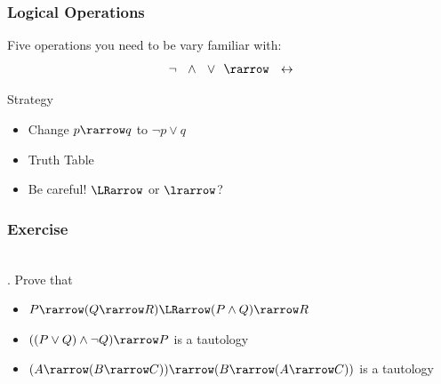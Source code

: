 \documentclass[xcolor=table]{beamer}
\begin{document}
\begin{frame}
    \frametitle{Logical Operations}
    Five operations you need to be vary familiar with:
    $$\neg ~~\wedge ~~\vee ~~  \rarrow ~~  \leftrightarrow$$
    \begin{block}{Strategy}
        \begin{itemize}
            \item Change $p \rarrow q$ to $\neg p \vee q$
            \item Truth Table
            \item Be careful! $\LRarrow$ or $\lrarrow$?
        \end{itemize}
    \end{block}
\end{frame}
\begin{frame}
    \frametitle{Exercise}
    \\. Prove that
    \begin{itemize}
        \item $P \rarrow (Q \rarrow R) \LRarrow (P \wedge Q) \rarrow R$
        \item $((P \vee Q) \wedge \neg Q) \rarrow P$ is a tautology
        \item $(A\rarrow(B\rarrow C))\rarrow (B\rarrow(A\rarrow C))$ is a tautology
    \end{itemize}
\end{frame}
\end{document}
